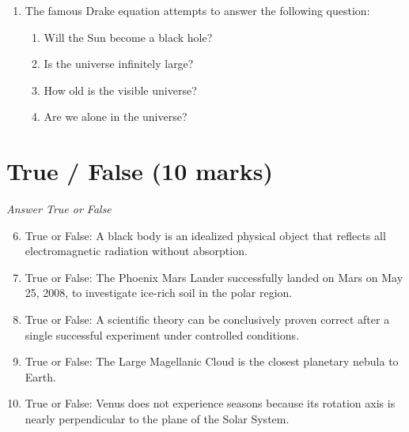 \documentclass[12pt]{article}
\begin{document}
\begin{enumerate}[label=\arabic*.]
\begin{enumerate}[label=(\alph*)]
    \item Mars does not have enough internal heat to drive the greenhouse effect
    \item Mars is too far from the sun for the greenhouse effect to work
    \item the greenhouse effect requires an ozone layer which Mars does not have
    \item the atmosphere on Mars is too thin to trap a significant amount of heat
\end{enumerate}
\item The famous Drake equation attempts to answer the following question:
\begin{enumerate}[label=(\alph*)]
    \item Will the Sun become a black hole?
    \item Is the universe infinitely large?
    \item How old is the visible universe?
    \item Are we alone in the universe?
\end{enumerate}
\end{enumerate}

\section*{True / False (10 marks)}
\textit{Answer True or False}
\begin{enumerate}[label=\arabic*.]
\setcounter{enumi}{5}
\item True or False: A black body is an idealized physical object that reflects all electromagnetic radiation without absorption.
\item True or False: The Phoenix Mars Lander successfully landed on Mars on May 25, 2008, to investigate ice-rich soil in the polar region.
\item True or False: A scientific theory can be conclusively proven correct after a single successful experiment under controlled conditions.
\item True or False: The Large Magellanic Cloud is the closest planetary nebula to Earth.
\item True or False: Venus does not experience seasons because its rotation axis is nearly perpendicular to the plane of the Solar System.
\end{enumerate}
\end{document}
